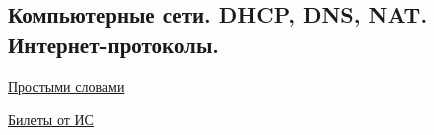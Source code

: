 \subsection{Компьютерные сети. DHCP, DNS, NAT. Интернет-протоколы.}

\href{https://mkdev.me/ru/posts/kak-rabotayut-seti-chto-takoe-svitch-router-dns-dhcp-nat-vpn-i-eschyo-s-desyatok-neobhodimyh-veschey}{Простыми словами}

\href{https://docs.google.com/document/d/1Q9Q3T_WhroC04ByS0BtFDbvEZ6DrQbuFPd7fAl2XSWM/edit#}{Билеты от ИС}